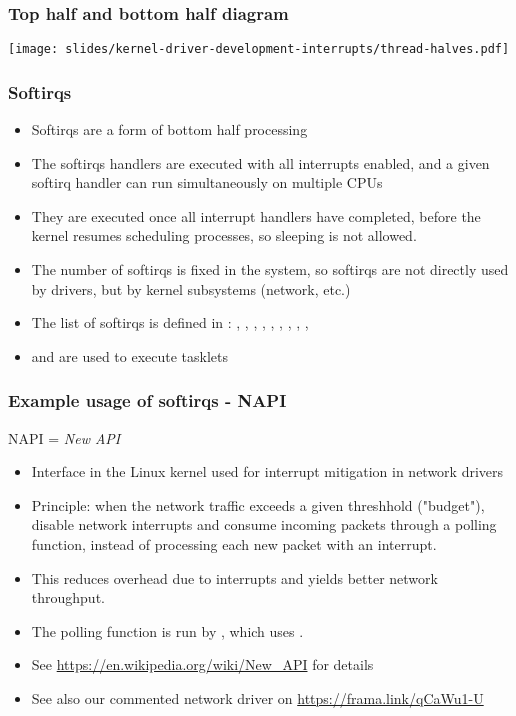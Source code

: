 \begin{frame}
  \frametitle{Top half and bottom half diagram}
  \begin{center}
    \texttt{[image: slides/kernel-driver-development-interrupts/thread-halves.pdf]}
  \end{center}
\end{frame}

\begin{frame}
  \frametitle{Softirqs}
  \begin{itemize}
  \item Softirqs are a form of bottom half processing
  \item The softirqs handlers are executed with all interrupts
    enabled, and a given softirq handler can run simultaneously on
    multiple CPUs
  \item They are executed once all interrupt handlers have completed,
    before the kernel resumes scheduling processes, so sleeping is not
    allowed.
  \item The number of softirqs is fixed in the system, so softirqs are
    not directly used by drivers, but by kernel subsystems (network,
    etc.)
  \item The list of softirqs is defined in
    : , ,
    , , ,
    , ,
    , , 
  \item {} and  are used to execute
    tasklets
  \end{itemize}
\end{frame}

\begin{frame}
  \frametitle{Example usage of softirqs - NAPI}
  NAPI = {\em New API}
  \begin{itemize}
  \item Interface in the Linux kernel used for interrupt mitigation in
        network drivers
  \item Principle: when the network traffic exceeds a given threshhold
        ("budget"), disable network interrupts and consume incoming packets
        through a polling function, instead of processing each new
        packet with an interrupt.
  \item This reduces overhead due to interrupts and yields better
        network throughput.
  \item The polling function is run by , which uses
        .
  \item See \url{https://en.wikipedia.org/wiki/New_API} for details
  \item See also our commented network driver on \url{https://frama.link/qCaWu1-U}
  \end{itemize}

\end{frame}

